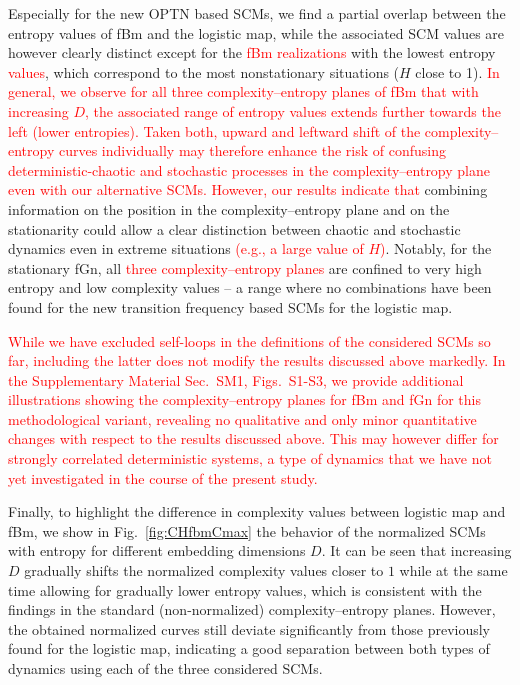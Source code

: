 \documentclass[aip,cha,reprint,nofootinbib]{revtex4-1}
\begin{document}
Especially for the new OPTN based SCMs, we find a partial overlap between the entropy values of fBm and the logistic map, while the associated SCM values are however clearly distinct except for the \textcolor{red}{fBm realizations} with the lowest entropy \textcolor{red}{values}, which correspond to the most nonstationary situations ($H$ close to 1). 
\textcolor{red}{In general, we observe for all three complexity--entropy planes of fBm that with increasing $D$, the associated range of entropy values extends further towards the left (lower entropies). Taken both, upward and leftward shift of the complexity--entropy curves individually may therefore enhance the risk of confusing deterministic-chaotic and stochastic processes in the complexity--entropy plane even with our alternative SCMs. However, our results indicate that} combining information on the position in the complexity--entropy plane and on the stationarity could allow a clear distinction between chaotic and stochastic dynamics even in extreme situations \textcolor{red}{(e.g., a large value of $H$)}. Notably, for the stationary fGn, all \textcolor{red}{three complexity--entropy planes} are confined to very high entropy and low complexity values -- a range where no combinations have been found for the new transition frequency based SCMs for the logistic map. 

\textcolor{red}{While we have excluded self-loops in the definitions of the considered SCMs so far, including the latter does not modify the results discussed above markedly. In the Supplementary Material Sec.~SM1, Figs.~S1-S3, we provide additional illustrations showing the complexity--entropy planes for fBm and fGn for this methodological variant, revealing no qualitative and only minor quantitative changes with respect to the results discussed above. This may however differ for strongly correlated deterministic systems, a type of dynamics that we have not yet investigated in the course of the present study.}

{\color{red}Finally, to highlight the difference in complexity values between logistic map and fBm, we show in Fig.~\ref{fig:CHfbmCmax} the behavior of the normalized SCMs with entropy for different embedding dimensions $D$. It can be seen that increasing $D$ gradually shifts the normalized complexity values closer to $1$ while at the same time allowing for gradually lower entropy values, which is consistent with the findings in the standard (non-normalized) complexity--entropy planes. However, the obtained normalized curves still deviate significantly from those previously found for the logistic map, indicating a good separation between both types of dynamics using each of the three considered SCMs.}
\end{document}
